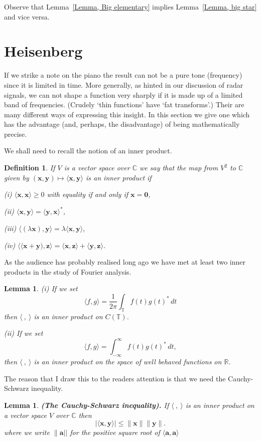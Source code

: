 \documentclass[12pt]{article}
\newtheorem{lemma}[theorem]{Lemma}
\newtheorem{definition}[theorem]{Definition}
\theoremstyle{definition}
\begin{document}
Observe that Lemma~\ref{Lemma, Big elementary}
implies Lemma~\ref{Lemma, big star} and vice versa.
\section{Heisenberg} If we strike a note on the piano
the result can not be a pure tone (frequency) since
it is limited in time. More generally, as hinted in our discussion
of radar signals, we can not shape a function very
sharply if it is made up of a limited band of frequencies.
(Crudely `thin functions' have `fat transforms'.)
Their are many different ways of expressing this insight.
In this section we give one which has the advantage
(and, perhaps, the disadvantage) of being mathematically
precise.

We shall need to recall the notion of an inner product.
\begin{definition} If $V$ is a vector space over ${\mathbb C}$
we say that the map from $V^{2}$ to ${\mathbb C}$ given by
$({\mathbf x},{\mathbf y})\mapsto
\langle {\mathbf x},{\mathbf y}\rangle$ is an inner product if

(i) $\langle {\mathbf x},{\mathbf x}\rangle\geq 0$ with equality
if and only if ${\mathbf x}={\mathbf 0}$,

(ii) $\langle{\mathbf x},{\mathbf y}\rangle
=\langle{\mathbf y},{\mathbf x}\rangle^{*}$,

(iii) $\langle(\lambda{\mathbf x}),{\mathbf y}\rangle=
\lambda\langle{\mathbf x},{\mathbf y}\rangle$,

(iv) $\langle\langle{\mathbf x}+{\mathbf y}),{\mathbf z}\rangle
=\langle{\mathbf x},{\mathbf z}\rangle+
\langle{\mathbf y},{\mathbf z}\rangle.$
\end{definition}
As the audience has probably realised long ago we
have met at least two inner products in the study
of Fourier analysis.
\begin{lemma} (i) If we set
\[\langle f,g \rangle=\frac{1}{2\pi}\int_{\mathbb T}f(t)g(t)^{*}\,dt\]
then $\langle\ ,\ \rangle$ is an inner product on $C({\mathbb T})$.

(ii) If we set
\[\langle f,g \rangle=\int_{-\infty}^{\infty}f(t)g(t)^{*}\,dt,\]
then $\langle\ ,\ \rangle$ is an inner product on the space 
of well behaved functions on ${\mathbb R}$.
\end{lemma}
The reason that I draw this to the readers attention is
that we need the Cauchy-Schwarz inequality.
\begin{lemma}{\bf (The Cauchy-Schwarz inequality).}%
\label{Cauchy-Schwarz}
If $\langle\ ,\ \rangle$ is an inner product on a vector space $V$
over ${\mathbb C}$
then 
\[|\langle{\mathbf x},{\mathbf y}\rangle|\leq
\|{\mathbf x}\| \|{\mathbf y}\|.\]
where we write $\|{\mathbf a}||$ for the positive square root
of $\langle{\mathbf a},{\mathbf a}\rangle$
\end{lemma}
\end{document}
